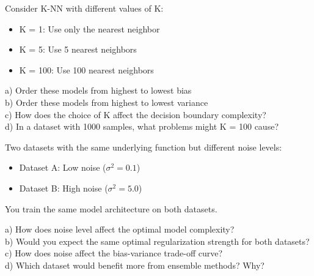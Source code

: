\documentclass{article}
\newcounter{exercise}
\begin{document}
\begin{tcolorbox}[colback=gray!5!white,colframe=gray!75!black,title=Problem \stepcounter{exercise}: K-Nearest Neighbors Analysis]

Consider K-NN with different values of K:
\begin{itemize}
    \item K = 1: Use only the nearest neighbor
    \item K = 5: Use 5 nearest neighbors
    \item K = 100: Use 100 nearest neighbors
\end{itemize}

a) Order these models from highest to lowest bias\\
b) Order these models from highest to lowest variance\\
c) How does the choice of K affect the decision boundary complexity?\\
d) In a dataset with 1000 samples, what problems might K = 100 cause?
\end{tcolorbox}

\begin{tcolorbox}[colback=gray!5!white,colframe=gray!75!black,title=Problem \stepcounter{exercise}: Noise Impact Analysis]

Two datasets with the same underlying function but different noise levels:
\begin{itemize}
    \item Dataset A: Low noise ($\sigma^2 = 0.1$)
    \item Dataset B: High noise ($\sigma^2 = 5.0$)
\end{itemize}

You train the same model architecture on both datasets.

a) How does noise level affect the optimal model complexity?\\
b) Would you expect the same optimal regularization strength for both datasets?\\
c) How does noise affect the bias-variance trade-off curve?\\
d) Which dataset would benefit more from ensemble methods? Why?
\end{tcolorbox}
\end{document}
